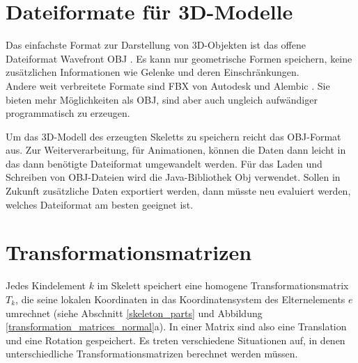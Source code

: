 \section{Dateiformate für 3D-Modelle}

Das einfachste Format zur Darstellung von 3D-Objekten ist das offene Dateiformat Wavefront OBJ \cite{obj}. Es kann nur geometrische Formen speichern, keine zusätzlichen Informationen wie \zb Gelenke und deren Einschränkungen.\\
Andere weit verbreitete Formate sind FBX von Autodesk \cite{fbx} und Alembic \cite{alembic}. Sie bieten mehr Möglichkeiten als OBJ, sind aber auch ungleich aufwändiger programmatisch zu erzeugen.

Um das 3D-Modell des erzeugten Skeletts zu speichern reicht das OBJ-Format aus. Zur Weiterverarbeitung, \zb für Animationen, können die Daten dann leicht in das dann benötigte Dateiformat umgewandelt werden. Für das Laden und Schreiben von OBJ-Dateien wird die Java-Bibliothek Obj \cite{ObjLoader} verwendet.
Sollen in Zukunft zusätzliche Daten exportiert werden, dann müsste neu evaluiert werden, welches Dateiformat am besten geeignet ist.




\section{Transformationsmatrizen}
\label{implementation_detail_matrices}

Jedes Kindelement $k$ im Skelett speichert eine homogene Transformationsmatrix $T_k$, die seine lokalen Koordinaten in das Koordinatensystem des Elternelements $e$ umrechnet (siehe Abschnitt \ref{skeleton_parts} und Abbildung \ref{transformation_matrices_normal}a). In einer Matrix sind also eine Translation und eine Rotation gespeichert.
Es treten verschiedene Situationen auf, in denen unterschiedliche Transformationsmatrizen berechnet werden müssen.

